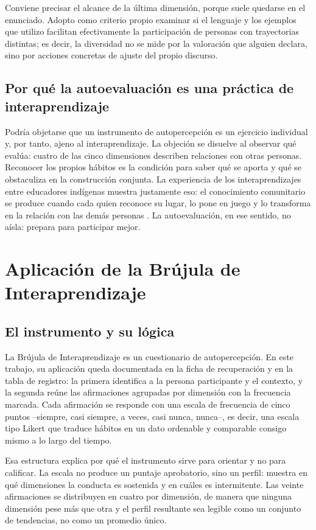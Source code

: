 \documentclass[
  spanish,
  letterpaper, oneside
]{article}
\begin{document}
Conviene precisar el alcance de la última dimensión, porque suele quedarse en el
enunciado. Adopto como criterio propio examinar si el lenguaje y los ejemplos que
utilizo facilitan efectivamente la participación de personas con trayectorias
distintas; es decir, la diversidad no se mide por la valoración que alguien declara,
sino por acciones concretas de ajuste del propio discurso.

\subsection{Por qué la autoevaluación es una práctica de interaprendizaje}

Podría objetarse que un instrumento de autopercepción es un ejercicio individual y,
por tanto, ajeno al interaprendizaje. La objeción se disuelve al observar qué evalúa:
cuatro de las cinco dimensiones describen relaciones con otras personas. Reconocer
los propios hábitos es la condición para saber qué se aporta y qué se obstaculiza en
la construcción conjunta. La experiencia de los interaprendizajes entre educadores
indígenas muestra justamente eso: el conocimiento comunitario se produce cuando cada
quien reconoce su lugar, lo pone en juego y lo transforma en la relación con las
demás personas \citep{bertely2011interaprendizajes}. La autoevaluación, en ese
sentido, no aísla: prepara para participar mejor.

\section{Aplicación de la Brújula de Interaprendizaje}

\subsection{El instrumento y su lógica}

La Brújula de Interaprendizaje es un cuestionario de autopercepción. En este
trabajo, su aplicación queda documentada en la ficha de recuperación y en la tabla de
registro: la primera identifica a la persona participante y el contexto, y la segunda
reúne las afirmaciones agrupadas por dimensión con la frecuencia marcada. Cada afirmación se responde con una escala de
frecuencia de cinco puntos --siempre, casi siempre, a veces, casi nunca, nunca--, es
decir, una escala tipo Likert que traduce hábitos en un dato ordenable y comparable
consigo mismo a lo largo del tiempo.

Esa estructura explica por qué el instrumento sirve para orientar y no para calificar.
La escala no produce un puntaje aprobatorio, sino un perfil: muestra en qué
dimensiones la conducta es sostenida y en cuáles es intermitente. Las veinte
afirmaciones se distribuyen en cuatro por dimensión, de manera que ninguna
dimensión pese más que otra y el perfil resultante sea legible como un conjunto de
tendencias, no como un promedio único.
\end{document}
